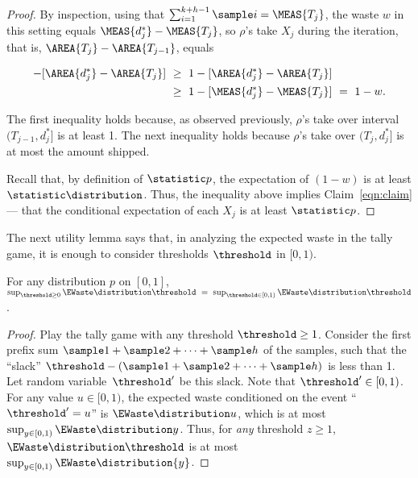 \begin{proof}
  By inspection, using that $\sum_{i=1}^{k+h-1} \sample i = \MEAS{T_j}$,
  the waste $w$ in this setting equals $\MEAS{d^*_j} - \MEAS{T_j}$,
  so $\rho$'s take $X_{j}$ during the iteration,  that is, $\AREA{T_j} - \AREA{T_{j-1}}$, equals

  \begin{align*}
  [\AREA{d^*_j} - \AREA{T_{j-1}}]
  -
  [\AREA{d^*_j} - \AREA{T_j}]
  ~&\ge~
  1
  -
  [\AREA{d^*_j} - \AREA{T_j}]
		\\
  ~&\ge~
  1 - [\MEAS{d^*_j} - \MEAS{T_j}]
  ~=~ 
  1-w.
  \end{align*}

  The first inequality holds because,
  as observed previously, $\rho$'s take over interval $(T_{j-1},d^*_j]$ is at least 1.
  The next inequality holds because
  $\rho$'s take over $(T_j, d^*_j]$ is at most the amount shipped.

  Recall that, by definition of $\statistic p$,
  the expectation of $(1-w)$ is at least $\statistic \distribution$.
  Thus, the inequality above implies Claim~\eqref{eqn:claim} --- that
  the conditional expectation of each $X_{j}$ is at least $\statistic p$.
\end{proof}

The next utility lemma
says that, in analyzing the expected waste in the tally game,
it is enough to consider thresholds $\threshold$ in $[0,1)$.

\begin{lemma}\label{lemma: 01}
  For any distribution $p$ on $[0,1]$,
  $\sup_{\threshold\ge 0} \EWaste \distribution \threshold  ~=~\sup_{\threshold\in[0,1)} \EWaste \distribution \threshold $.
\end{lemma}

\begin{proof}
  Play the tally game with any threshold $\threshold \geq 1$.  
  Consider the first prefix sum $\sample 1+\sample 2+\cdots+\sample h$
  of the samples, such that the ``slack'' 
  $\threshold - (\sample 1 + \sample 2 + \cdots + \sample h)$ is less than 1.
  Let random variable~$\threshold'$ be this slack.  Note that $\threshold'\in[0,1)$. 
  For any value $u\in[0,1)$,
  the expected waste conditioned on the event ``$\threshold'=u$'' is $\EWaste \distribution u$,
  which is at most $\sup_{y\in[0,1)} \EWaste \distribution y$.
  Thus, for \emph{any} threshold $z\ge 1$, $\EWaste \distribution \threshold $ 
  is at most $\sup_{y\in[0,1)} \EWaste \distribution {y}$. 
\end{proof}




